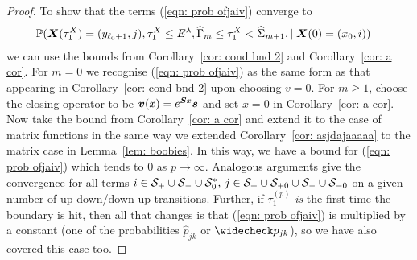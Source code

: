 \begin{proof}
	To show that the terms (\ref{eqn: prob ofjaiv}) converge to 
	\begin{align}
		&\mathbb P(\boldsymbol X(\tau_1^X)=(y_{\ell_0+1},j),\tau_1^X\leq E^\lambda, \widehat{\Gamma}_{m}\leq \tau_1^X<\widehat{\Sigma}_{m+1}, \mid \boldsymbol X(0)=(x_0, i))
	\end{align}
	we can use the bounds from Corollary~\ref{cor: cond bnd 2} and Corollary~\ref{cor: a cor}. For \(m=0\) we recognise (\ref{eqn: prob ofjaiv}) as the same form as that appearing in Corollary~\ref{cor: cond bnd 2} upon choosing \(v=0\). For \(m\geq 1\), choose the closing operator to be \(\boldsymbol v(x)=e^{\boldsymbol S x}\boldsymbol s\) and set \(x=0\) in Corollary~\ref{cor: a cor}. Now take the bound from Corollary~\ref{cor: a cor} and extend it to the case of matrix functions in the same way we extended Corollary~\ref{cor: asjdajaaaaa} to the matrix case in Lemma~\ref{lem: boobies}. In this way, we have a bound for (\ref{eqn: prob ofjaiv}) which tends to \(0\) as \(p\to\infty\). Analogous arguments give the convergence for all terms \(i\in\mathcal{S}_+\cup\mathcal{S}_-\cup\mathcal{S}_0^*,\,j\in\mathcal{S}_+\cup\mathcal{S}_{+0}\cup\mathcal{S}_-\cup\mathcal{S}_{-0}\) on a given number of up-down/down-up transitions. Further, if \(\tau_1^{(p)}\) \emph{is} the first time the boundary is hit, then all that changes is that (\ref{eqn: prob ofjaiv}) is multiplied by a constant (one of the probabilities \(\widehat p_{jk}\) or \(\widecheck p_{jk}\)), so we have also covered this case too. 


\end{proof}
